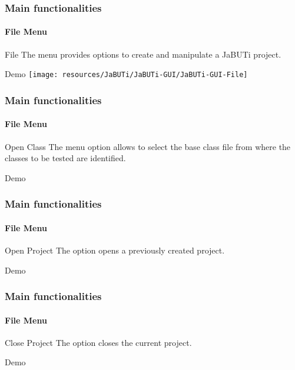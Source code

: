 \begin{frame}[parent={cmap:jabuti-gui},hasnext=true,hasprev=true]
\frametitle{Main functionalities}
\framesubtitle{File Menu}
\label{concept:file-menu}

\begin{block}{File}
The  menu provides options to create and manipulate a JaBUTi project.
\end{block}

\begin{block}{Demo}
\texttt{[image: resources/JaBUTi/JaBUTi-GUI/JaBUTi-GUI-File]}
\end{block}
\end{frame}



\begin{frame}
\frametitle{Main functionalities}
\framesubtitle{File Menu}
\label{concept:open-class}

\begin{block}{Open Class}
The  menu option allows to select the base
class file from where the classes to be tested are identified.
\end{block}

\begin{block}{Demo}
\end{block}
\end{frame}



\begin{frame}
\frametitle{Main functionalities}
\framesubtitle{File Menu}
\label{concept:open-project}

\begin{block}{Open Project}
The  option opens a previously created project.
\end{block}

\begin{block}{Demo}
\end{block}
\end{frame}



\begin{frame}
\frametitle{Main functionalities}
\framesubtitle{File Menu}
\label{concept:close-project}

\begin{block}{Close Project}
The  option closes the current project.
\end{block}

\begin{block}{Demo}
\end{block}
\end{frame}




